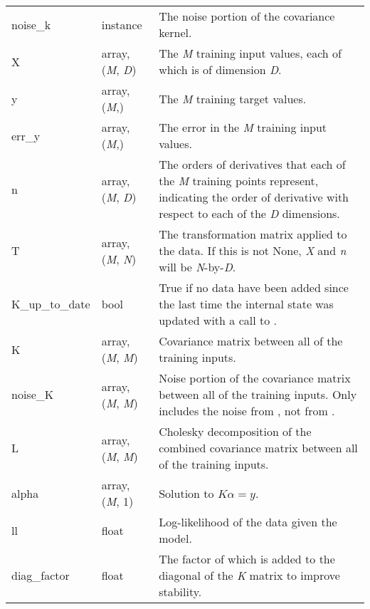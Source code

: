 \documentclass[letterpaper,10pt,english]{sphinxmanual}
\begin{document}
\begin{fulllineitems}
\begin{tabulary}{\linewidth}{|L|L|L|}
noise\_k
 & 
{\hyperref[gptools.kernel:gptools.kernel.core.Kernel]{}} instance
 & 
The noise portion of the covariance kernel.
\\

X
 & 
array, (\emph{M}, \emph{D})
 & 
The \emph{M} training input values, each of which is of dimension \emph{D}.
\\

y
 & 
array, (\emph{M},)
 & 
The \emph{M} training target values.
\\

err\_y
 & 
array, (\emph{M},)
 & 
The error in the \emph{M} training input values.
\\

n
 & 
array, (\emph{M}, \emph{D})
 & 
The orders of derivatives that each of the \emph{M} training points represent, indicating the order of derivative with respect to each of the \emph{D} dimensions.
\\

T
 & 
array, (\emph{M}, \emph{N})
 & 
The transformation matrix applied to the data. If this is not None, \emph{X} and \emph{n} will be \emph{N}-by-\emph{D}.
\\

K\_up\_to\_date
 & 
bool
 & 
True if no data have been added since the last time the internal state was updated with a call to {\hyperref[gptools:gptools.gaussian_process.GaussianProcess.compute_K_L_alpha_ll]{}}.
\\

K
 & 
array, (\emph{M}, \emph{M})
 & 
Covariance matrix between all of the training inputs.
\\

noise\_K
 & 
array, (\emph{M}, \emph{M})
 & 
Noise portion of the covariance matrix between all of the training inputs. Only includes the noise from , not from .
\\

L
 & 
array, (\emph{M}, \emph{M})
 & 
Cholesky decomposition of the combined covariance matrix between all of the training inputs.
\\

alpha
 & 
array, (\emph{M}, 1)
 & 
Solution to \(K\alpha=y\).
\\

ll
 & 
float
 & 
Log-likelihood of the data given the model.
\\

diag\_factor
 & 
float
 & 
The factor of  which is added to the diagonal of the \emph{K} matrix to improve stability.
\\


\end{tabulary}
\end{fulllineitems}
\end{document}

